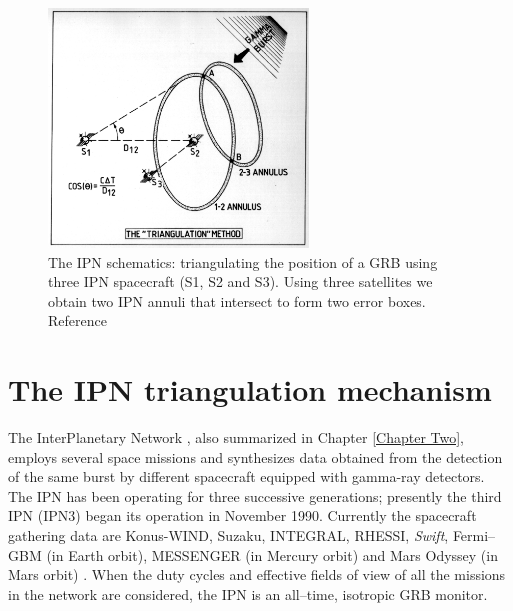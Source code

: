 \begin{figure}[htb]
\begin{center}
\includegraphics[height=15pc]{Images/ipn1.pdf}
\caption{\label{fig:triangulation}The IPN schematics: triangulating the position of a GRB using three IPN spacecraft (S1, S2 and S3). Using three satellites we obtain two IPN annuli that intersect to form two error boxes. Reference \cite{HurleyHTML}}
\end{center}
\label{IPNtriangulation}
\end{figure}

\section{The IPN triangulation mechanism}
The InterPlanetary Network \cite{Hurley:2002wv, Hurley:1999ym}, also summarized in Chapter \ref{Chapter Two}, employs several space missions and synthesizes data obtained from the detection of the same burst by different spacecraft equipped with gamma-ray detectors. The IPN has been operating for three successive generations; presently the third IPN (IPN3) began its operation in November 1990. Currently the spacecraft gathering data are Konus-WIND, Suzaku, INTEGRAL,  RHESSI, \emph{Swift}, Fermi--GBM (in Earth orbit), MESSENGER (in Mercury orbit) and Mars Odyssey (in Mars orbit) \cite{HurleyHTML}. When the duty cycles and effective fields of view of all the missions in the network are considered, the IPN is an all--time, isotropic GRB monitor.

